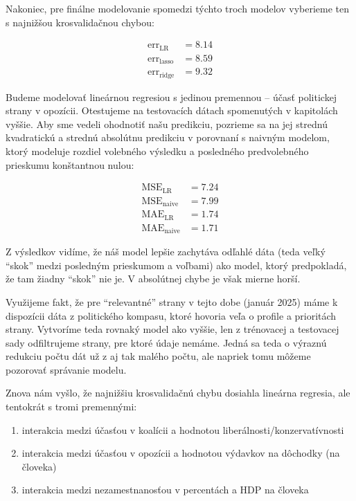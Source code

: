 \documentclass[main.tex]{subfiles}
\begin{document}
Nakoniec, pre finálne modelovanie spomedzi týchto troch modelov vyberieme ten s najnižšou krosvalidačnou chybou:

\begin{align*}
	\operatorname{err}_{\operatorname{LR}} &= 8.14 \\
	\operatorname{err}_{\operatorname{lasso}} &= 8.59 \\
	\operatorname{err}_{\operatorname{ridge}} &= 9.32
\end{align*}

Budeme modelovať lineárnou regresiou s jedinou premennou -- účasť politickej strany v opozícii. Otestujeme na testovacích dátach spomenutých v kapitolách vyššie. Aby sme vedeli ohodnotiť našu predikciu, pozrieme sa na jej strednú kvadratickú a strednú absolútnu predikciu v porovnaní s naivným modelom, ktorý modeluje rozdiel volebného výsledku a posledného predvolebného prieskumu konštantnou nulou:

\begin{align*}
	\operatorname{MSE}_{\operatorname{LR}} &= 7.24 \\
	\operatorname{MSE}_{\operatorname{naive}} &= 7.99 \\
	\operatorname{MAE}_{\operatorname{LR}} &= 1.74 \\
	\operatorname{MAE}_{\operatorname{naive}} &= 1.71
\end{align*}

Z výsledkov vidíme, že náš model lepšie zachytáva odľahlé dáta (teda veľký \enquote{skok} medzi posledným prieskumom a voľbami) ako model, ktorý predpokladá, že tam žiadny \enquote{skok} nie je. V absolútnej chybe je však mierne horší.

Využijeme fakt, že pre \enquote{relevantné} strany v tejto dobe (január 2025) máme k dispozícii dáta z politického kompasu, ktoré hovoria veľa o profile a prioritách strany. Vytvoríme teda rovnaký model ako vyššie, len z trénovacej a testovacej sady odfiltrujeme strany, pre ktoré údaje nemáme. Jedná sa teda o výraznú redukciu počtu dát už z aj tak malého počtu, ale napriek tomu môžeme pozorovať správanie modelu.

Znova nám vyšlo, že najnižšiu krosvalidačnú chybu dosiahla lineárna regresia, ale tentokrát s tromi premennými:

\begin{enumerate}
	\item interakcia medzi účasťou v koalícii a hodnotou liberálnosti/konzervatívnosti
	\item interakcia medzi účasťou v opozícii a hodnotou výdavkov na dôchodky (na človeka)
	\item interakcia medzi nezamestnanosťou v percentách a HDP na človeka
\end{enumerate}
\end{document}
